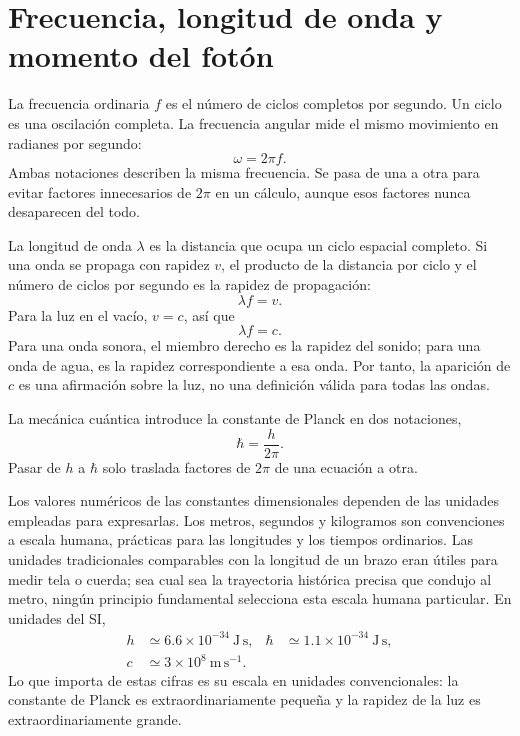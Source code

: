 \section{Frecuencia, longitud de onda y momento del fotón}

La frecuencia ordinaria \(f\) es el número de ciclos completos por segundo. Un ciclo es una oscilación completa. La frecuencia angular mide el mismo movimiento en radianes por segundo:
\begin{equation}
\omega=2\pi f.
\end{equation}
Ambas notaciones describen la misma frecuencia. Se pasa de una a otra para evitar factores innecesarios de \(2\pi\) en un cálculo, aunque esos factores nunca desaparecen del todo.

La longitud de onda \(\lambda\) es la distancia que ocupa un ciclo espacial completo. Si una onda se propaga con rapidez \(v\), el producto de la distancia por ciclo y el número de ciclos por segundo es la rapidez de propagación:
\begin{equation}
\lambda f=v.
\end{equation}
Para la luz en el vacío, \(v=c\), así que
\begin{equation}
\lambda f=c.
\end{equation}
Para una onda sonora, el miembro derecho es la rapidez del sonido; para una onda de agua, es la rapidez correspondiente a esa onda. Por tanto, la aparición de \(c\) es una afirmación sobre la luz, no una definición válida para todas las ondas.

La mecánica cuántica introduce la constante de Planck en dos notaciones,
\begin{equation}
\hbar=\frac{h}{2\pi}.
\end{equation}
Pasar de \(h\) a \(\hbar\) solo traslada factores de \(2\pi\) de una ecuación a otra.

Los valores numéricos de las constantes dimensionales dependen de las unidades empleadas para expresarlas. Los metros, segundos y kilogramos son convenciones a escala humana, prácticas para las longitudes y los tiempos ordinarios. Las unidades tradicionales comparables con la longitud de un brazo eran útiles para medir tela o cuerda; sea cual sea la trayectoria histórica precisa que condujo al metro, ningún principio fundamental selecciona esta escala humana particular. En unidades del SI,
\begin{equation}
\begin{aligned}
h &\simeq 6.6\times10^{-34}\ \mathrm{J\,s},
&\hbar &\simeq 1.1\times10^{-34}\ \mathrm{J\,s},\\
c &\simeq 3\times10^8\ \mathrm{m\,s^{-1}}.
\end{aligned}
\end{equation}
Lo que importa de estas cifras es su escala en unidades convencionales: la constante de Planck es extraordinariamente pequeña y la rapidez de la luz es extraordinariamente grande.

